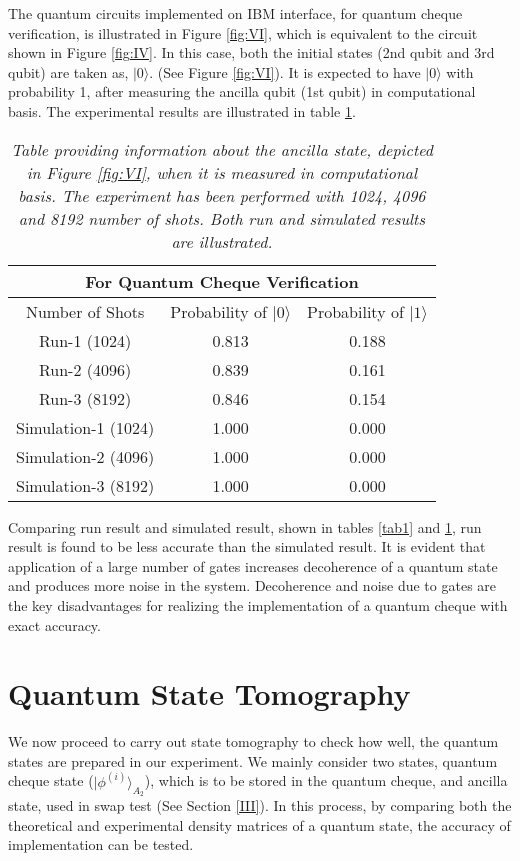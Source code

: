 \documentclass[aps,pra,twocolumn,groupedaddress,showpacs,showkeys]{revtex4-1}
\begin{document}
The quantum circuits implemented on IBM interface, for quantum cheque verification, is illustrated in Figure \ref{fig:VI}, which is equivalent to the circuit shown in Figure \ref{fig:IV}. In this case, both the initial states (2nd qubit and 3rd qubit) are taken as, $|0\rangle$. (See Figure \ref{fig:VI}). It is expected to have $|0\rangle$ with probability 1, after measuring the ancilla qubit (1st qubit) in computational basis. The experimental results are illustrated in table \ref{tab2}. 

\begin{table}[h]
\centering
\caption{\emph{Table providing information about the ancilla state, depicted in Figure \ref{fig:VI}, when it is measured in computational basis. The experiment has been performed with 1024, 4096 and 8192 number of shots. Both run and simulated results are illustrated.}}
\begin{tabular}{|c|c|c|}
\hline
\multicolumn{3}{|c|}{For Quantum Cheque Verification}\\
 \hline
Number of Shots
& Probability of $|0\rangle$ & Probability of $|1\rangle$\\
 \hline
Run-1 (1024) & 0.813 & 0.188 \\
Run-2 (4096) & 0.839 & 0.161 \\
Run-3 (8192) & 0.846 & 0.154 \\ \hline
Simulation-1 (1024) & 1.000 & 0.000\\
Simulation-2 (4096) & 1.000 & 0.000\\
Simulation-3 (8192) & 1.000 & 0.000\\
 \hline
\end{tabular}
\label{tab2}
\end{table}

Comparing run result and simulated result, shown in tables \ref{tab1} and \ref{tab2}, run result is found to be less accurate than the simulated result. It is evident that application of a large number of gates increases decoherence of a quantum state and produces more noise in the system. Decoherence and noise due to gates are the key disadvantages for realizing the implementation of a quantum cheque with exact accuracy.  
 
\section{Quantum State Tomography \label{V}}
We now proceed to carry out state tomography to check how well, the quantum states are prepared in our experiment. We mainly consider two states, quantum cheque state ($|\phi^{(i)}\rangle_{A_2}$), which is to be stored in the quantum cheque, and ancilla state, used in swap test (See Section \ref{III}). In this process, by comparing both the theoretical and experimental density matrices of a quantum state, the accuracy of implementation can be tested. 
\end{document}
